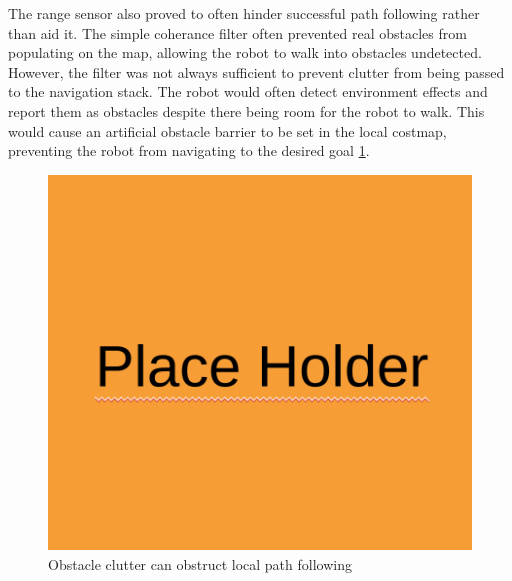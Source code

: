 The range sensor also proved to often hinder successful path following rather than aid it. The simple coherance filter often prevented real obstacles from populating on the map, allowing the robot to walk into obstacles undetected. However, the filter was not always sufficient to prevent clutter from being passed to the navigation stack. The robot would often detect environment effects and report them as obstacles despite there being room for the robot to walk. This would cause an artificial obstacle barrier to be set in the local costmap, preventing the robot from navigating to the desired goal \ref{fig:clutter_barrier}. 

\begin{figure}[H]
    \centerline{\includegraphics[scale=0.25]{place_holder.png}}
    \caption{Obstacle clutter can obstruct local path following}
    \label{fig:clutter_barrier}
\end{figure}

